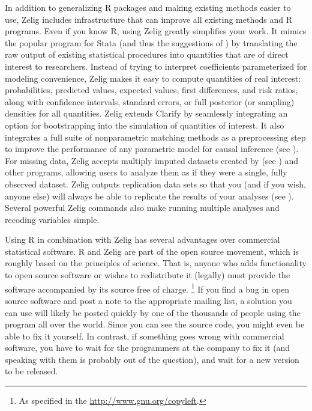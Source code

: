 \documentclass[letterpaper,10pt,english]{sphinxmanual}
\begin{document}
In addition to generalizing R packages and making existing methods
easier to use, Zelig includes infrastructure that can improve all
existing methods and R programs. Even if you know R, using Zelig greatly
simplifies your work. It mimics the popular program for Stata (and thus
the suggestions of ) by translating the raw output of existing
statistical procedures into quantities that are of direct interest to
researchers. Instead of trying to interpret coefficients parameterized
for modeling convenience, Zelig makes it easy to compute quantities of
real interest: probabilities, predicted values, expected values, first
differences, and risk ratios, along with confidence intervals, standard
errors, or full posterior (or sampling) densities for all quantities.
Zelig extends Clarify by seamlessly integrating an option for
bootstrapping into the simulation of quantities of interest. It also
integrates a full suite of nonparametric matching methods as a
preprocessing step to improve the performance of any parametric model
for causal inference (see ). For missing data, Zelig accepts multiply
imputed datasets created by (see ) and other programs, allowing users to
analyze them as if they were a single, fully observed dataset. Zelig
outputs replication data sets so that you (and if you wish, anyone else)
will always be able to replicate the results of your analyses (see ).
Several powerful Zelig commands also make running multiple analyses and
recoding variables simple.

Using R in combination with Zelig has several advantages over commercial
statistical software. R and Zelig are part of the open source movement,
which is roughly based on the principles of science. That is, anyone who
adds functionality to open source software or wishes to redistribute it
(legally) must provide the software accompanied by its source free of
charge. \footnote{
As specified in the \href{http://www.gnu.org/copyleft}{http://www.gnu.org/copyleft}.
} If you find a bug in open source software and post a note
to the appropriate mailing list, a solution you can use will likely be
posted quickly by one of the thousands of people using the program all
over the world. Since you can see the source code, you might even be
able to fix it yourself. In contrast, if something goes wrong with
commercial software, you have to wait for the programmers at the company
to fix it (and speaking with them is probably out of the question), and
wait for a new version to be released.
\end{document}
